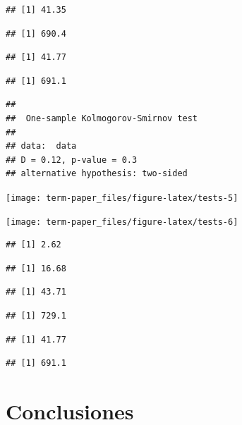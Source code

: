 \documentclass[9pt,twocolumn,twoside,]{pnas-new}
\begin{document}
\begin{verbatim}
## [1] 41.35
\end{verbatim}

\begin{verbatim}
## [1] 690.4
\end{verbatim}

\begin{verbatim}
## [1] 41.77
\end{verbatim}

\begin{verbatim}
## [1] 691.1
\end{verbatim}

\begin{verbatim}
## 
##  One-sample Kolmogorov-Smirnov test
## 
## data:  data
## D = 0.12, p-value = 0.3
## alternative hypothesis: two-sided
\end{verbatim}

\begin{flushleft}\texttt{[image: term-paper\_files/figure-latex/tests-5]} \end{flushleft}

\begin{flushleft}\texttt{[image: term-paper\_files/figure-latex/tests-6]} \end{flushleft}

\begin{verbatim}
## [1] 2.62
\end{verbatim}

\begin{verbatim}
## [1] 16.68
\end{verbatim}

\begin{verbatim}
## [1] 43.71
\end{verbatim}

\begin{verbatim}
## [1] 729.1
\end{verbatim}

\begin{verbatim}
## [1] 41.77
\end{verbatim}

\begin{verbatim}
## [1] 691.1
\end{verbatim}

\hypertarget{conclusiones}{%
\section*{Conclusiones}\label{conclusiones}}
\end{document}
